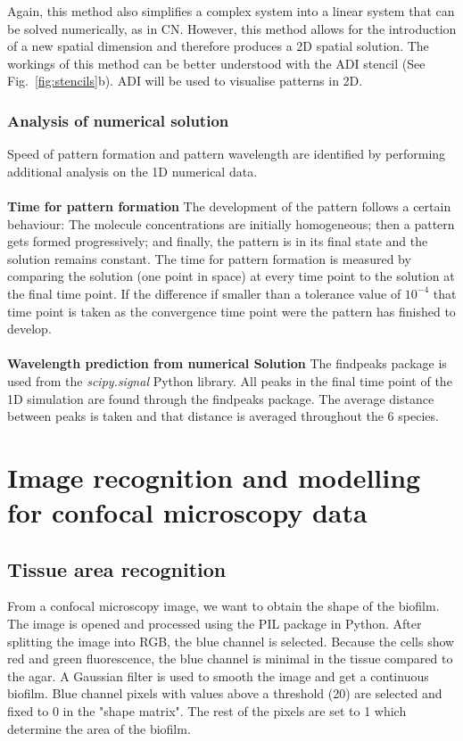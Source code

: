 Again, this method also simplifies a complex system into a linear system that can be solved numerically, as in \acrshort{CN}. However, this method allows for the introduction of a new spatial dimension and therefore produces a 2D spatial solution. The workings of this method can be better understood with the \acrshort{ADI} stencil (See Fig.~\ref{fig:stencils}b). \acrshort{ADI} will be used to visualise patterns in 2D.
\subsubsection{Analysis of numerical solution}
Speed of pattern formation and pattern wavelength are identified by performing additional analysis on the 1D numerical data.  \\\\
\textbf{Time for pattern formation}
The development of the pattern follows a certain behaviour: The molecule concentrations are initially homogeneous; then a pattern gets formed progressively; and finally, the pattern is in its final state and the solution remains constant.  The time for pattern formation is measured by comparing the solution (one point in space) at every time point to the solution at the final time point. If the difference if smaller than a tolerance value of $10^{-4}$ that time point is taken as the convergence time point were the pattern has finished to  develop. \\\\
\textbf{Wavelength prediction from numerical Solution}
The findpeaks package is used from the \textit{scipy.signal} Python library. All peaks in the final time point of the 1D simulation are found through the findpeaks package. The average distance between peaks is taken and that distance is averaged throughout the 6 species.

\section{Image recognition and modelling for confocal microscopy data}
\subsection{Tissue area recognition}\label{Tissue area recognition}
From a confocal microscopy image, we want to obtain the shape of the biofilm.
The image is opened and processed using the PIL package in Python.
After splitting the image into RGB, the blue channel is selected.
Because the cells show red and green fluorescence, the blue channel is minimal in the tissue compared to the agar.
A Gaussian filter is used to smooth the image and get a continuous biofilm.
Blue channel pixels with values above a threshold (20) are selected and fixed to 0 in the "shape matrix".
The rest of the pixels are set to 1 which determine the area of the biofilm.


